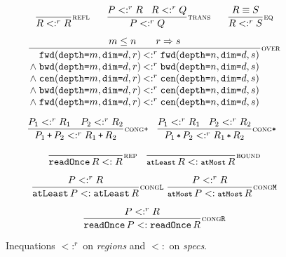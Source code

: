 \documentclass[9pt]{sigplanconf}
\theoremstyle{definition}
\newcommand{\term}[1]{\texttt{#1}}
\newcommand{\stenFwdSR}[3]{\term{fwd} (\term{depth=}#1,
  \term{dim=}#2, #3)}
\newcommand{\stenBwdSR}[3]{\term{bwd} (\term{depth=}#1,
  \term{dim=}#2, #3)}
\newcommand{\stenCenSR}[3]{\term{cen} (\term{depth=}#1,
  \term{dim=}#2, #3)}
\newcommand{\trule}[1]{\footnotesize{#1}}
\begin{document}
\begin{figure}[t]
\begin{align*}
\begin{array}{c}
%
\dfrac{}{R <:^r R}\trule{\textsc{refl}} \qquad \dfrac{P <:^r R \quad R <:^r Q}{P <:^r
  Q}\trule{\textsc{trans}} 
\qquad
\dfrac{R \equiv S}{R <:^r S}\trule{\textsc{eq}} 
\\[1.5em]
\setlength{\arraycolsep}{0.1em}
\dfrac{\hspace{3em} m \leq n \qquad r \Rightarrow s \hspace{3em}}
{\begin{array}{rl}
\stenFwdSR{m}{d}{r} & <:^r \stenFwdSR{n}{d}{s}
\\
\wedge \; \stenBwdSR{m}{d}{r} & <:^r \stenBwdSR{n}{d}{s}
\\
\wedge \; \stenCenSR{m}{d}{r} & <:^r \stenCenSR{n}{d}{s}
\\
\wedge \; \stenBwdSR{m}{d}{r} & <:^r \stenCenSR{n}{d}{s} \\
\wedge \; \stenFwdSR{m}{d}{r} & <:^r \stenCenSR{n}{d}{s} \\[1em]
\end{array}}\trule{\textsc{over}} \\
\hspace{-0.5em}
\dfrac{P_1 <:^r R_1 \quad P_2 <:^r R_2}
      {P_1 \, \texttt{+} \, P_2 <:^r R_1 \, \texttt{+} \, R_2}
\trule{\textsc{cong}\texttt{+}} \;\;\;
\dfrac{P_1 <:^r R_1 \quad P_2 <:^r R_2}
      {P_1 \, \texttt{*} \, P_2 <:^r R_1 \, \texttt{*} \, R_2}
\trule{\textsc{cong}\texttt{*}} \\[1.5em]
%
\dfrac{}{\term{readOnce} \, R <: R}\trule{\textsc{rep}}
\quad
\dfrac{}{\term{atLeast} \, R <: \term{atMost} \,
  R}\trule{\textsc{bound}} \\[1.5em]
\dfrac{P <:^r R}{\term{atLeast} \, P <: \term{atLeast} \,
  R}\trule{\textsc{cong}\texttt{L}}
\ 
\dfrac{P <:^r R}{\term{atMost} \, P <: \term{atMost} \,
  R}\trule{\textsc{cong}\texttt{M}} \\[1.5em]
\dfrac{P <:^r R}{\term{readOnce} \, P <: \term{readOnce} \,
  R}\trule{\textsc{cong}\texttt{R}} 
\end{array}
\end{align*}
\caption{Inequations $<:^r$ on \textit{regions} and
$<:$ on \textit{specs}.}
\label{fig:inequations}
\end{figure}
\end{document}

